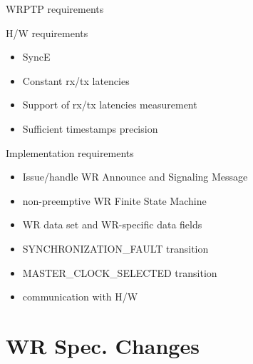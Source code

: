 \documentclass[compress,red]{beamer}
\begin{document}
\begin{frame}{WRPTP requirements}




  \begin{block}{H/W requirements}  
    \begin{itemize}
	\item SyncE
	\item Constant rx/tx latencies
	\item Support of rx/tx latencies measurement
	\item Sufficient timestamps precision
    \end{itemize}
  \end{block}


  \begin{block}{Implementation requirements}  
    \begin{itemize}
	\item Issue/handle WR Announce and Signaling Message
	\item non-preemptive WR Finite State Machine
	\item WR data set and WR-specific data fields
	\item SYNCHRONIZATION\_FAULT transition
	\item MASTER\_CLOCK\_SELECTED transition
	\item communication with H/W
    \end{itemize}
  \end{block}


\end{frame}
\section{WR Spec. Changes}
\end{document}
